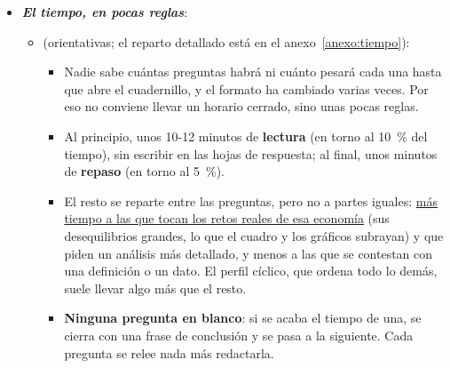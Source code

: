 \documentclass[11pt]{article}
\begin{document}
\begin{itemize}
\begin{itemize}
  \item Se aprende con dictámenes resueltos: primero el método y el perfil cíclico, después un dictamen oficial completo con el reloj delante, y luego los demás bloques.
  \item Los gráficos y las filas poco habituales del cuadernillo \textbf{no suelen ser gratuitos} (días de huelga, uso de la capacidad productiva, precios de los activos o de las materias primas): si el tribunal los da, es para usarlos en alguna respuesta (anexo~\ref{anexo:leer}).
  \item Se pide ser \textbf{perspicaz, no descriptivo}: explicar qué hay detrás de los datos y no contarlos año a año (ejemplo en el apartado~\ref{sec:demanda}).
  \end{itemize}

\item \textbf{\emph{El tiempo, en pocas reglas}}:
  \begin{itemize}
  \item (orientativas; el reparto detallado está en el anexo~\ref{anexo:tiempo}):
  \begin{itemize}
  \item Nadie sabe cuántas preguntas habrá ni cuánto pesará cada una hasta que abre el cuadernillo, y el formato ha cambiado varias veces. Por eso no conviene llevar un horario cerrado, sino unas pocas reglas.
  \item Al principio, unos 10-12 minutos de \textbf{lectura} (en torno al 10~\% del tiempo), sin escribir en las hojas de respuesta; al final, unos minutos de \textbf{repaso} (en torno al 5~\%).
  \item El resto se reparte entre las preguntas, pero no a partes iguales: \uline{más tiempo a las que tocan los retos reales de esa economía} (sus desequilibrios grandes, lo que el cuadro y los gráficos subrayan) y que piden un análisis más detallado, y menos a las que se contestan con una definición o un dato. El perfil cíclico, que ordena todo lo demás, suele llevar algo más que el resto.
  \item \textbf{Ninguna pregunta en blanco}: si se acaba el tiempo de una, se cierra con una frase de conclusión y se pasa a la siguiente. Cada pregunta se relee nada más redactarla.
  \end{itemize}
  \end{itemize}
\end{itemize}
\end{document}
